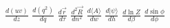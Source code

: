 \documentclass{article}
\begin{document}
$\frac{d(uv)}{dz}$ $\frac{d\left(q^2\right)}{dq}$ $\frac{d\vec r}{d\tau}$ $\frac{d^2\vec R}{dn^2}$ $\frac{d\langle A\rangle}{dw}$
$\frac{d|\psi\rangle}{dh}$ $\frac{d\ln Z}{d\beta}$ $\frac{d\sin\phi}{d\phi}$
\end{document}
